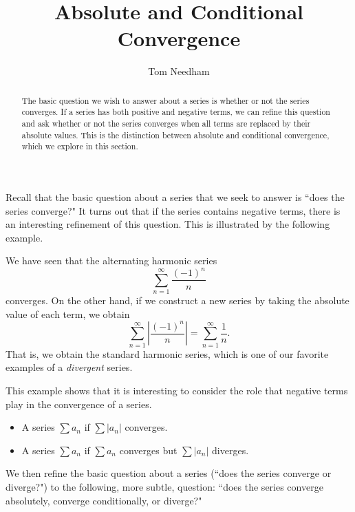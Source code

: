 \documentclass{ximera}
\author{Tom Needham}
\title[Dig-In:]{Absolute and Conditional Convergence}
\begin{document}
\begin{abstract}
The basic question we wish to answer about a series is whether or not the series converges. If a series has both positive and negative terms, we can refine this question and ask whether or not the series converges when all terms are replaced by their absolute values. This is the distinction between absolute and conditional convergence, which we explore in this section.
\end{abstract}
\maketitle


Recall that the basic question about a series that we seek to answer is ``does the series converge?" It turns out that if the series contains negative terms, there is an interesting refinement of this question. This is illustrated by the following example. 

\begin{example}
We have seen that the alternating harmonic series 
$$
\sum_{n=1}^\infty \frac{(-1)^n}{n}
$$
converges. On the other hand, if we construct a new series by taking the absolute value of each term, we obtain
$$
\sum_{n=1}^\infty \left| \frac{(-1)^n}{n} \right| = \sum_{n=1}^\infty \frac{1}{n}.
$$
That is, we obtain the standard harmonic series, which is one of our favorite examples of a \emph{divergent} series.
\end{example}

This example shows that it is interesting to consider the role that negative terms play in the convergence of a series. 

\begin{definition}\hfil
\begin{itemize}
\item A series $\sum  a_n$  if $\sum  |a_n|$ converges.
\item A series $\sum  a_n$  if $\sum  a_n$ converges but $\sum  |a_n|$ diverges.
\end{itemize}
\end{definition}

We then refine the basic question about a series (``does the series converge or diverge?") to the following, more subtle, question: ``does the series converge absolutely, converge conditionally, or diverge?"
\end{document}
